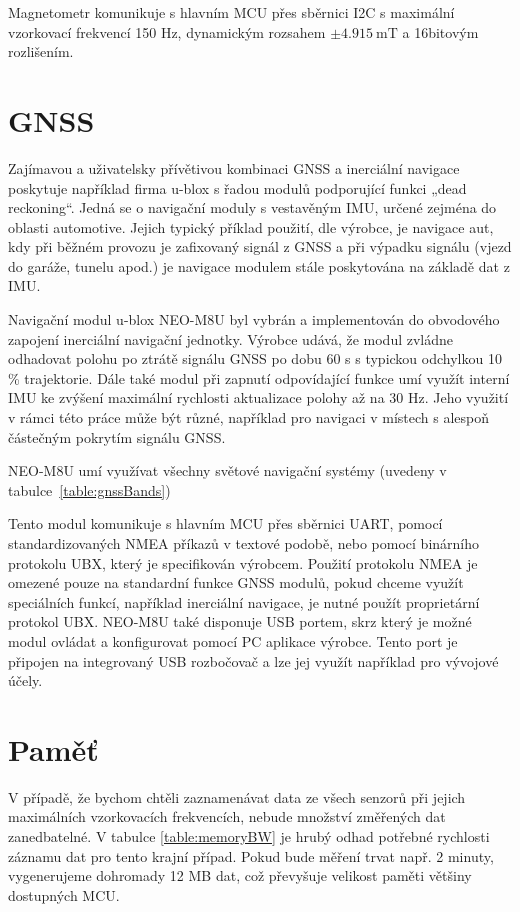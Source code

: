 Magnetometr komunikuje s hlavním MCU přes sběrnici I2C s maximální vzorkovací frekvencí 150 Hz, dynamickým rozsahem $ \pm \SI{4.915}{\milli\tesla} $ a 16bitovým rozlišením. \cite{RD5DwZcremhT6bgp}

\section{GNSS}
Zajímavou a uživatelsky přívětivou kombinaci GNSS a inerciální navigace poskytuje například firma u-blox s řadou modulů podporující funkci „dead reckoning“. Jedná se o navigační moduly s vestavěným IMU, určené zejména do oblasti automotive. Jejich typický příklad použití, dle výrobce, je navigace aut, kdy při běžném provozu je zafixovaný signál z GNSS a při výpadku signálu (vjezd do garáže, tunelu apod.) je navigace modulem stále poskytována na základě dat z IMU. \cite{DLQg9bT6V1GWKhxh}

Navigační modul u-blox NEO-M8U byl vybrán a implementován do obvodového zapojení inerciální navigační jednotky.
Výrobce udává, že modul zvládne odhadovat polohu po ztrátě signálu GNSS po dobu 60 s s typickou odchylkou 10 \% trajektorie. Dále také modul při zapnutí odpovídající funkce umí využít interní IMU ke zvýšení maximální rychlosti aktualizace polohy až na 30 Hz. Jeho využití v rámci této práce může být různé, například pro navigaci v místech s alespoň částečným pokrytím signálu GNSS. \cite{DLQg9bT6V1GWKhxh}

NEO-M8U umí využívat všechny světové navigační systémy (uvedeny v tabulce~\ref{table:gnssBands})

Tento modul komunikuje s hlavním MCU přes sběrnici UART, pomocí standardizovaných NMEA příkazů v textové podobě, nebo pomocí binárního protokolu UBX, který je specifikován výrobcem. Použití protokolu NMEA je omezené pouze na standardní funkce GNSS modulů, pokud chceme využít speciálních funkcí, například inerciální navigace, je nutné použít proprietární protokol UBX. \cite{DLQg9bT6V1GWKhxh} NEO-M8U také disponuje USB portem, skrz který je možné modul ovládat a konfigurovat pomocí PC aplikace výrobce. Tento port je připojen na integrovaný USB rozbočovač a lze jej využít například pro vývojové účely.

\section{Paměť}

V případě, že bychom chtěli zaznamenávat data ze všech senzorů při jejich maximálních vzorkovacích frekvencích, nebude množství změřených dat zanedbatelné. V tabulce \ref{table:memoryBW} je hrubý odhad potřebné rychlosti záznamu dat pro tento krajní případ. Pokud bude měření trvat např. 2 minuty, vygenerujeme dohromady 12 MB dat, což převyšuje velikost paměti většiny dostupných MCU.

